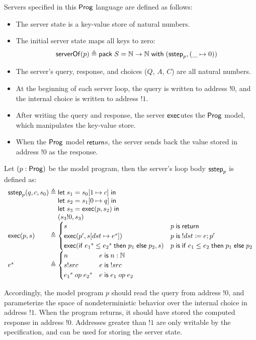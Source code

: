 Servers specified in this $\mathsf{Prog}$ language are defined as follows:
\begin{itemize}
\item The server state is a key-value store of natural numbers.
\item The initial server state maps all keys to zero:
  \[\mathsf{serverOf}(p)\triangleq\mathsf{pack}\;S=\mathbb N\to\mathbb N\;\mathsf{with}\;(\mathsf{sstep}_p,(\_\mapsto0))\]
\item The server's query, response, and choices ($Q$, $A$, $C$) are all
  natural numbers.
\item At the beginning of each server loop, the query is written to address
  $!0$, and the internal choice is written to address $!1$.
\item After writing the query and response, the server $\mathsf{exec}$utes the $\mathsf{Prog}$
  model, which manipulates the key-value store.
\item When the $\mathsf{Prog}$ model $\mathsf{return}$s, the server sends back the value stored
  in address $!0$ as the response.
\end{itemize}
Let $(p:\mathsf{Prog})$ be the model program, then the server's loop body $\mathsf{sstep}_p$ is
defined as:
\[\begin{array}{l@{\;}r@{\;}l}
\sstep_p(q,c,s_0)&\triangleq&\letin{s_1}{\update{s_0}{1}{c}}\\
&&\letin{s_2}{\update{s_1}{0}{q}}\\
&&\letin{s_3}{\Exec(p,s_2)}\\
&&(s_3!0,s_3)\\
\Exec(p,s)&\triangleq&
\begin{cases}
  s&p\Is\Return\\
  \Exec(p',\update{s}{dst}{e^s})&p\Is !dst\coloneqq e;p'\\
  \Exec(\If {e_1}^s\le{e_2}^s\Then p_1\Else p_2,s)&p\Is\If e_1\le e_2\Then p_1\Else p_2
\end{cases}\\
e^s&\triangleq&
\begin{cases}
  n&e\Is n:\Nat\\
  s!src&e\Is !src\\
  {e_1}^s\;op\;{e_2}^s&e\Is e_1\;op\;e_2
\end{cases}
\end{array}\]

Accordingly, the model program $p$ should read the query from address $!0$, and
parameterize the space of nondeterministic behavior over the internal choice in
address $!1$.  When the program returns, it should have stored the computed
response in address $!0$.  Addresses greater than $!1$ are only writable by the
specification, and can be used for storing the server state.

